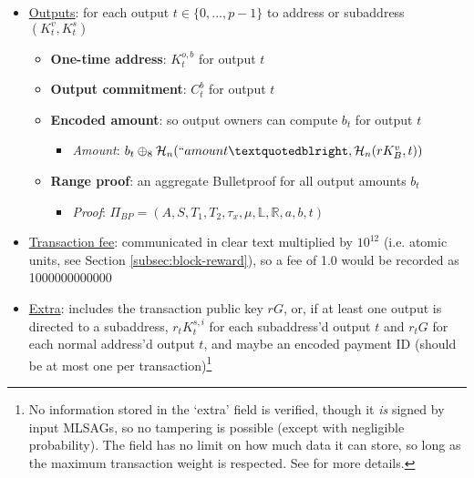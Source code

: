 \begin{itemize}
    \item \underline{Outputs}: for each output $t \in \{0,...,p-1\}$ to address or subaddress $(K^v_t,K^s_t)$
    \begin{itemize}
        \item \textbf{One-time address}: $K^{o,b}_t$ for output $t$
        \item \textbf{Output commitment}: $C^{b}_t$ for output $t$
        \item \textbf{Encoded amount}: so output owners can compute $b_t$ for output $t$
        \begin{itemize}
            \item \textit{Amount}: $b_t \oplus_8 \mathcal{H}_n(``amount”, \mathcal{H}_n(r K_B^v, t))$
        \end{itemize}
        \item \textbf{Range proof}: an aggregate Bulletproof for all output amounts $b_t$
        \begin{itemize}
            \item \textit{Proof}: $\Pi_{BP} = (A, S, T_1, T_2, \tau_x, \mu, \mathbb{L}, \mathbb{R}, a, b, t)$
        \end{itemize}
    \end{itemize}
    \item \underline{Transaction fee}: communicated in clear text multiplied by $10^{12}$ (i.e. atomic units, see Section \ref{subsec:block-reward}), so a fee of 1.0 would be recorded as 1000000000000
    \item \underline{Extra}: includes the transaction public key $r G$, or, if at least one output is directed to a subaddress, $r_t K^{s,i}_t$ for each subaddress'd output $t$ and $r_t G$ for each normal address'd output $t$, and maybe an encoded payment ID (should be at most one per transaction)\footnote{No information stored in the `extra' field is verified, though it {\em is} signed by input MLSAGs, so no tampering is possible (except with negligible probability). The field has no limit on how much data it can store, so long as the maximum transaction weight is respected. See \cite{extra-field-stackexchange} for more details.}
\end{itemize}

